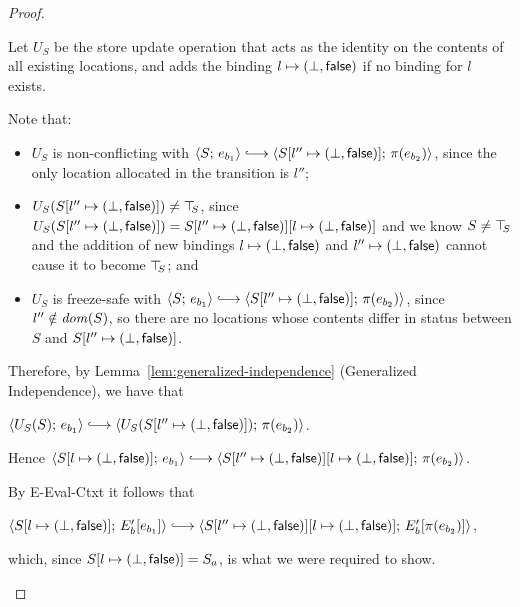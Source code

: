 \begin{proof}
\begin{enumerate}
\begin{enumerate}
\begin{itemize}
        Let $U_S$ be the store update operation that acts as the
        identity on the contents of all existing locations, and adds
        the binding $l \mapsto (\bot, \textsf{false})$ if no
        binding for $l$ exists.

        Note that:
        \begin{itemize}
        \item $U_S$ is non-conflicting with $\config{S}{e_{b_1}}
          \parstepsto
          \config{\extS{S}{l''}{\bot}{\frozenfalse}}{\pi(e_{b_2})}$,
          since the only location allocated in the transition is
          $l''$;
        \item $U_S(S[l'' \mapsto (\bot, \textsf{false})]) \neq \top\hspace{-0.85mm}_{S}$,
          since $U_S(S[l'' \mapsto (\bot, \textsf{false})]) = \\
          S[l'' \mapsto (\bot, \textsf{false})][l \mapsto (\bot, \textsf{false})]$
          and we know $S \neq \top\hspace{-0.85mm}_{S}$ and the addition of new
          bindings $l \mapsto (\bot, \textsf{false})$ and
          $l'' \mapsto (\bot, \textsf{false})$ cannot cause it
          to become $\top\hspace{-0.85mm}_{S}$; and
        \item $U_S$ is freeze-safe with $\config{S}{e_{b_1}}
          \parstepsto
          \config{\extS{S}{l''}{\bot}{\frozenfalse}}{\pi(e_{b_2})}$,
          since $l'' \notin \mathit{dom}(S)$, so there are no locations
          whose contents differ in status between $S$ and
          $S[l'' \mapsto (\bot, \textsf{false})]$.
        \end{itemize}

        Therefore, by Lemma~\ref{lem:generalized-independence}
        (Generalized Independence), we have that

        $\config{U_S(S)}{e_{b_1}} \parstepsto
        \config{U_S(\extS{S}{l''}{\bot}{\frozenfalse})}{\pi(e_{b_2})}$.

        Hence $\config{\extS{S}{l}{\bot}{\frozenfalse}}{e_{b_1}}
        \parstepsto
        \config{\extS{\extS{S}{l''}{\bot}{\frozenfalse}}{l}{\bot}{\frozenfalse}}{\pi(e_{b_2})}$.

        By {\sc E-Eval-Ctxt} it follows that

        $\config{\extS{S}{l}{\bot}{\frozenfalse}}{\evalctxt{E'_b}{e_{b_1}}}
        \parstepsto
        \config{\extS{\extS{S}{l''}{\bot}{\frozenfalse}}{l}{\bot}{\frozenfalse}}{\evalctxt{E'_b}{\pi(e_{b_2})}}$,

        which, since $S[l \mapsto (\bot, \textsf{false})] = S_a$, is what
        we were required to show.


\end{itemize}
\end{enumerate}
\end{enumerate}
\end{proof}
